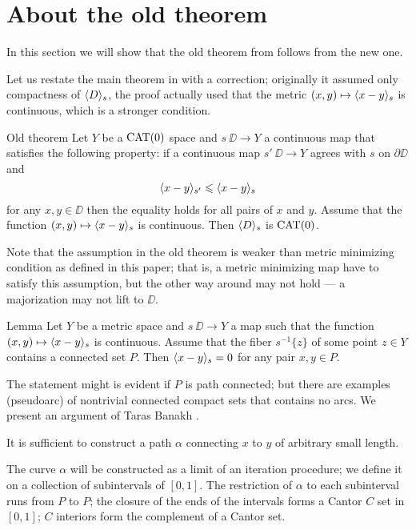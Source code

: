 \section{About the old theorem}\label{sec:old-thm}

In this section we will show that the old theorem from \cite{petrunin-metric-min} follows from the new one.

Let us restate the main theorem in \cite{petrunin-metric-min} with a correction;
originally it assumed only compactness of $\langle D\rangle_s$,
the proof actually used that the metric $(x,y)\zz\mapsto\<x-y\>_{s}$ is continuous,
which is a stronger condition.

\begin{thm}{Old theorem}
Let $Y$ be a $\mathop{\rm CAT}\nolimits(0)$ space and $s\:\DD\to Y$ a continuous map that satisfies the following property: 
if a continuous map $s'\:\DD\to Y$ agrees with $s$ on $\partial\DD$ and
\[\langle x-y\rangle_{s'}\leqslant \langle x-y\rangle_{s}\]
for any $x,y\in \DD$
then the equality holds for all pairs of $x$ and $y$.
Assume that the function $(x,y)\mapsto\langle x-y\rangle_{s}$ is continuous.
Then $\langle D\rangle_s$ is $\mathop{\rm CAT}\nolimits(0)$.
\end{thm}

Note that the assumption in the old theorem is weaker than metric minimizing condition as defined in this paper;
that is, a metric minimizing map have to satisfy this assumption, but the other way around may not hold --- a majorization may not lift to $\DD$.

\begin{thm}{Lemma}
Let $Y$ be a metric space and $s\:\DD\to Y$ a map such that the function $(x,y)\mapsto\langle x-y\rangle_{s}$ is continuous.
Assume that the fiber $s^{-1}\{z\}$ of some point $z\in Y$ contains a connected set $P$.
Then $\langle x-y\rangle_{s}=0$ for any pair $x,y\in P$.
\end{thm}


The statement might is evident if $P$ is path connected; 
but there are examples (pseudoarc) of nontrivial connected compact sets that contains no arcs.
We present an argument of Taras Banakh \cite{banakh}.

It is sufficient to construct a path $\alpha$ connecting $x$ to $y$ of arbitrary small length.

The curve $\alpha$ will be constructed as a limit of an iteration procedure;
we define it on a collection of subintervals of $[0,1]$.
The restriction of $\alpha$ to each subinterval runs from $P$ to $P$;
the closure of the ends of the intervals forms a Cantor $C$ set in $[0,1]$; 
 $C$ interiors form the complement of a Cantor set.

